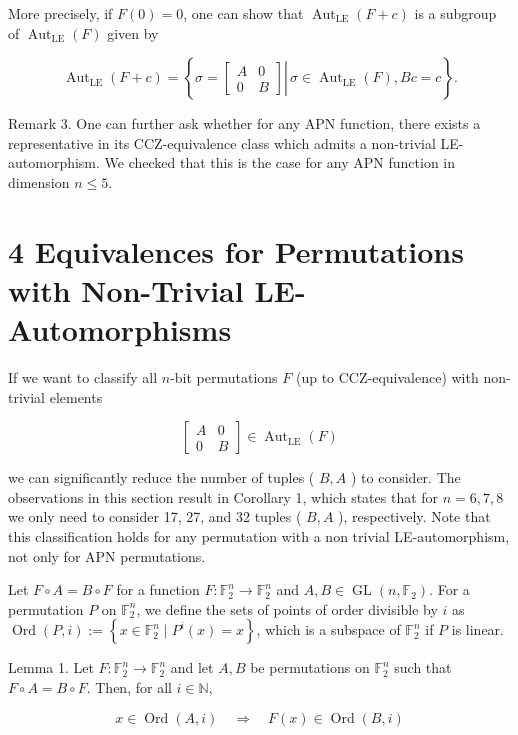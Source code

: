 \documentclass[10pt]{article}
\begin{document}
More precisely, if $F(0)=0$, one can show that $\operatorname{Aut}_{\mathrm{LE}}(F+c)$ is a subgroup of $\operatorname{Aut}_{\mathrm{LE}}(F)$ given by

$$
\operatorname{Aut}_{\mathrm{LE}}(F+c)=\left\{\left.\sigma=\left[\begin{array}{cc}
A & 0 \\
0 & B
\end{array}\right] \right\rvert\, \sigma \in \operatorname{Aut}_{\mathrm{LE}}(F), B c=c\right\} .
$$

Remark 3. One can further ask whether for any APN function, there exists a representative in its CCZ-equivalence class which admits a non-trivial LE-automorphism. We checked that this is the case for any APN function in dimension $n \leq 5$.

\section*{4 Equivalences for Permutations with Non-Trivial LE-Automorphisms}
If we want to classify all $n$-bit permutations $F$ (up to CCZ-equivalence) with non-trivial elements

$$
\left[\begin{array}{cc}
A & 0 \\
0 & B
\end{array}\right] \in \operatorname{Aut}_{\mathrm{LE}}(F)
$$

we can significantly reduce the number of tuples ( $B, A$ ) to consider. The observations in this section result in Corollary 1, which states that for $n=6,7,8$ we only need to consider 17, 27, and 32 tuples ( $B, A$ ), respectively. Note that this classification holds for any permutation with a non trivial LE-automorphism, not only for APN permutations.

Let $F \circ A=B \circ F$ for a function $F: \mathbb{F}_{2}^{n} \rightarrow \mathbb{F}_{2}^{n}$ and $A, B \in \operatorname{GL}\left(n, \mathbb{F}_{2}\right)$. For a permutation $P$ on $\mathbb{F}_{2}^{n}$, we define the sets of points of order divisible by $i$ as $\operatorname{Ord}(P, i):= \left\{x \in \mathbb{F}_{2}^{n} \mid P^{i}(x)=x\right\}$, which is a subspace of $\mathbb{F}_{2}^{n}$ if $P$ is linear.

Lemma 1. Let $F: \mathbb{F}_{2}^{n} \rightarrow \mathbb{F}_{2}^{n}$ and let $A, B$ be permutations on $\mathbb{F}_{2}^{n}$ such that $F \circ A=B \circ F$. Then, for all $i \in \mathbb{N}$,

$$
x \in \operatorname{Ord}(A, i) \quad \Rightarrow \quad F(x) \in \operatorname{Ord}(B, i)
$$
\end{document}
